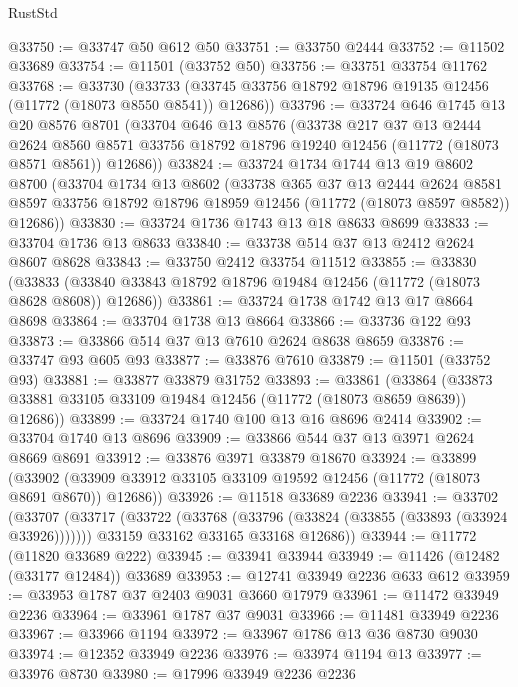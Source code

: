 \begin{lexlean}{RustStd}
\begin{coremodule}
@33750 := @33747 @50 @612 @50
@33751 := @33750 @2444
@33752 := @11502 @33689
@33754 := @11501 (@33752 @50)
@33756 := @33751 @33754 @11762
@33768 := @33730
    (@33733 (@33745 @33756 @18792 @18796 @19135 @12456 (@11772 (@18073 @8550 @8541)) @12686))
@33796 := @33724
    @646
    @1745
    @13
    @20
    @8576
    @8701
    (@33704
      @646
      @13
      @8576
      (@33738
        @217
        @37
        @13
        @2444
        @2624
        @8560
        @8571
        @33756
        @18792
        @18796
        @19240
        @12456
        (@11772 (@18073 @8571 @8561))
        @12686))
@33824 := @33724
    @1734
    @1744
    @13
    @19
    @8602
    @8700
    (@33704
      @1734
      @13
      @8602
      (@33738
        @365
        @37
        @13
        @2444
        @2624
        @8581
        @8597
        @33756
        @18792
        @18796
        @18959
        @12456
        (@11772 (@18073 @8597 @8582))
        @12686))
@33830 := @33724 @1736 @1743 @13 @18 @8633 @8699
@33833 := @33704 @1736 @13 @8633
@33840 := @33738 @514 @37 @13 @2412 @2624 @8607 @8628
@33843 := @33750 @2412 @33754 @11512
@33855 := @33830
    (@33833 (@33840 @33843 @18792 @18796 @19484 @12456 (@11772 (@18073 @8628 @8608)) @12686))
@33861 := @33724 @1738 @1742 @13 @17 @8664 @8698
@33864 := @33704 @1738 @13 @8664
@33866 := @33736 @122 @93
@33873 := @33866 @514 @37 @13 @7610 @2624 @8638 @8659
@33876 := @33747 @93 @605 @93
@33877 := @33876 @7610
@33879 := @11501 (@33752 @93)
@33881 := @33877 @33879 @31752
@33893 := @33861
    (@33864 (@33873 @33881 @33105 @33109 @19484 @12456 (@11772 (@18073 @8659 @8639)) @12686))
@33899 := @33724 @1740 @100 @13 @16 @8696 @2414
@33902 := @33704 @1740 @13 @8696
@33909 := @33866 @544 @37 @13 @3971 @2624 @8669 @8691
@33912 := @33876 @3971 @33879 @18670
@33924 := @33899
    (@33902 (@33909 @33912 @33105 @33109 @19592 @12456 (@11772 (@18073 @8691 @8670)) @12686))
@33926 := @11518 @33689 @2236
@33941 := @33702
    (@33707
      (@33717
        (@33722 (@33768 (@33796 (@33824 (@33855 (@33893 (@33924 @33926)))))))
        @33159
        @33162
        @33165
        @33168
        @12686))
@33944 := @11772 (@11820 @33689 @222)
@33945 := @33941 @33944
@33949 := @11426 (@12482 (@33177 @12484)) @33689
@33953 := @12741 @33949 @2236 @633 @612
@33959 := @33953 @1787 @37 @2403 @9031 @3660 @17979
@33961 := @11472 @33949 @2236
@33964 := @33961 @1787 @37 @9031
@33966 := @11481 @33949 @2236
@33967 := @33966 @1194
@33972 := @33967 @1786 @13 @36 @8730 @9030
@33974 := @12352 @33949 @2236
@33976 := @33974 @1194 @13
@33977 := @33976 @8730
@33980 := @17996 @33949 @2236 @2236

\end{coremodule}
\end{lexlean}
